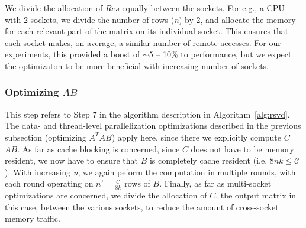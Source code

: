      We divide the allocation of $Res$ equally between
     the sockets. For e.g., a CPU with 2 sockets, we divide the
     number of rows ({\it{n}}) by 2, and allocate the memory for each
     relevant part of the matrix on its individual socket. This
     ensures that %
     each socket makes, on average, a similar number of
     remote accesses. For our experiments, this
     provided a boost of
     $\sim$5 -- 10\% to performance, but we expect the optimizaton
     to be more beneficial with increasing number of
     sockets.
     
     







    




\subsubsection{Optimizing $AB$}

    This step refers to Step 7 in the algorithm description in
    Algorithm~\ref{alg:rsvd}. The data- and thread-level parallelization optimizations described 
    in the previous subsection (optimizing $A^TAB$) apply here, since
    there we explicitly  compute $C$ = $AB$. As far as cache blocking is
    concerned, since $C$ does not have to be memory resident, we now have
    to ensure that $B$ is completely cache resident (i.e. $8nk\le
    \mathcal{C}$). With increasing {\it{n}}, we again peform the
    computation in multiple rounds, with each round operating on 
    $n'=\frac{\mathcal{C}}{8k}$ rows of $B$.
    Finally, as far as multi-socket optimizations are concerned, we
    divide the allocation of $C$, the output matrix in this case,
    between the various sockets, to reduce the amount of cross-socket
    memory traffic.





